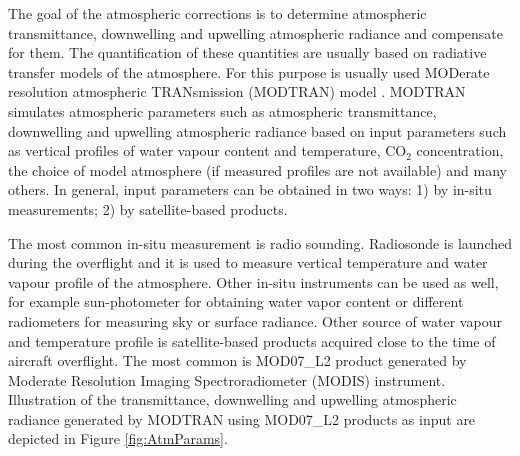 The goal of the atmospheric corrections is to determine atmospheric transmittance, downwelling and upwelling atmospheric radiance and compensate for them. The quantification of these quantities are usually based on radiative transfer models of the atmosphere. For this purpose is usually used MODerate resolution atmospheric TRANsmission (MODTRAN) model \cite{BG06}. MODTRAN simulates atmospheric parameters such as atmospheric transmittance, downwelling and upwelling atmospheric radiance based on input parameters such as vertical profiles of water vapour content and temperature, CO$_2$ concentration, the choice of model atmosphere (if measured profiles are not available) and many others. In general, input parameters can be obtained in two ways: 1) by in-situ measurements; 2) by satellite-based products.

The most common in-situ measurement is radio sounding. Radiosonde is launched during the overflight and it is used to measure vertical temperature and water vapour profile of the atmosphere. Other in-situ instruments can be used as well, for example sun-photometer for obtaining water vapor content or different radiometers for measuring sky or surface radiance. Other source of water vapour and temperature profile is satellite-based products acquired close to the time of aircraft overflight. The most common is MOD07\_L2 product \cite{B11} generated by Moderate Resolution Imaging Spectroradiometer (MODIS) instrument. Illustration of the transmittance, downwelling and upwelling atmospheric radiance generated by MODTRAN using MOD07\_L2 products as input are depicted in Figure \ref{fig:AtmParams}.

